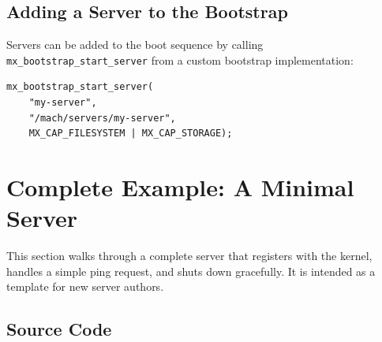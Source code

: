 \documentclass[a4paper,11pt]{article}
\begin{document}
\subsection{Adding a Server to the Bootstrap}

Servers can be added to the boot sequence by calling
\texttt{mx\_bootstrap\_start\_server} from a custom bootstrap
implementation:

\begin{lstlisting}
mx_bootstrap_start_server(
    "my-server",
    "/mach/servers/my-server",
    MX_CAP_FILESYSTEM | MX_CAP_STORAGE);
\end{lstlisting}

\section{Complete Example: A Minimal Server}

This section walks through a complete server that registers with the
kernel, handles a simple ping request, and shuts down gracefully. It
is intended as a template for new server authors.

\subsection{Source Code}
\end{document}
